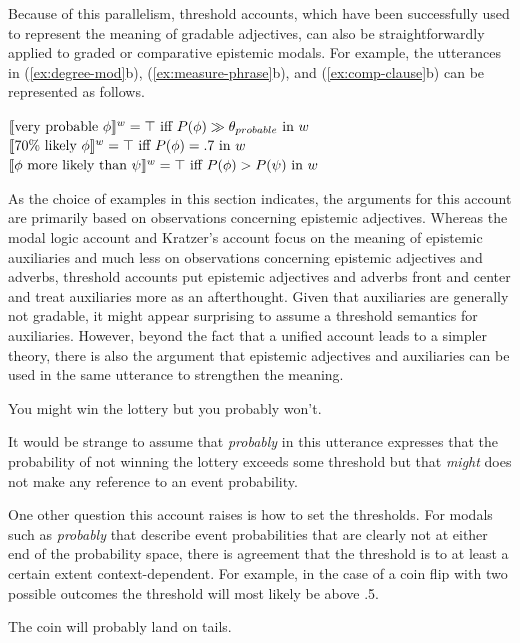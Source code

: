 \noindent Because of this parallelism, threshold accounts, which have been successfully used to represent the meaning of gradable adjectives,
can also be straightforwardly applied to graded or comparative epistemic modals. For example, the utterances in (\ref{ex:degree-mod}b), 
(\ref{ex:measure-phrase}b), and (\ref{ex:comp-clause}b)
can be represented as follows.

\begin{exe}
\ex $\llbracket\mbox{very probable } \phi\rrbracket^w = \top \mbox{ iff $P(\phi) \gg \theta_{probable}$ in $w$}$
\ex$ \llbracket\mbox{70\% likely } \phi\rrbracket^w = \top \mbox{ iff $P(\phi) = .7$  in $w$}$
 \ex$ \llbracket\phi \mbox{ more likely than } \psi\rrbracket^w = \top \mbox{ iff $P(\phi) > P(\psi) $  in $w$}$
\end{exe}

As the choice of examples in this section indicates, the arguments for this account are primarily
based on observations concerning epistemic adjectives. Whereas the modal logic account and Kratzer's
account focus on the meaning of epistemic auxiliaries and much less on observations concerning
epistemic adjectives and adverbs, threshold accounts put epistemic adjectives and adverbs front and center
and treat auxiliaries more as an afterthought. Given that auxiliaries are generally not gradable, it
might appear surprising to assume a threshold semantics for auxiliaries. However, beyond the fact
that a unified account leads to a simpler theory, there is also the argument that 
epistemic adjectives and auxiliaries can be used in the same 
utterance to strengthen the meaning.

\begin{exe}
\ex You might win the lottery but you probably won't.
\end{exe}

\noindent It would be strange to assume that \textit{probably} in this utterance expresses
that the probability of not winning the lottery exceeds some threshold but that \textit{might}
does not make any reference to an event probability.

One other question this account raises is how to set the thresholds. For modals such as \textit{probably} that describe
event probabilities that are clearly not at either end of the probability space, there is agreement that the threshold is
to at least a certain extent context-dependent. For example, in the case of a coin flip with two possible outcomes
the threshold will most likely be above .5.

\begin{exe}
\ex The coin will probably land on tails.
\end{exe}

